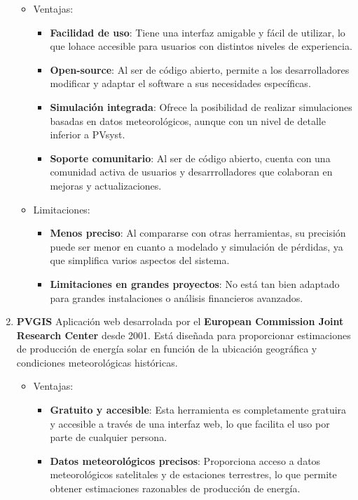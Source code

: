 \begin{enumerate}
\begin{itemize}
\item Ventajas:
\begin{itemize}
\item \textbf{Facilidad de uso}: Tiene una interfaz amigable y fácil de utilizar, lo que lohace accesible para usuarios con distintos niveles de experiencia.
\item \textbf{Open-source}: Al ser de código abierto, permite a los desarrolladores modificar y adaptar el software a sus necesidades específicas.
\item \textbf{Simulación integrada}: Ofrece la posibilidad de realizar simulaciones basadas en datos meteorológicos, aunque con un nivel de detalle inferior a PVsyst.
\item \textbf{Soporte comunitario}: Al ser de código abierto, cuenta con una comunidad activa de usuarios y desarrrolladores que colaboran en mejoras y actualizaciones.
\end{itemize}
\item Limitaciones:
\begin{itemize}
\item \textbf{Menos preciso}: Al compararse con otras herramientas, su precisión puede ser menor en cuanto a modelado y simulación de pérdidas, ya que simplifica varios aspectos del sistema.
\item \textbf{Limitaciones en grandes proyectos}: No está tan bien adaptado para grandes instalaciones o análisis financieros avanzados.
\end{itemize}
\end{itemize}
\item \textbf{PVGIS} \cite{pvgis}
Aplicación web desarrolada por el \textbf{European Commission Joint Research Center} desde 2001. Está diseñada para proporcionar estimaciones de producción de energía solar en función de la ubicación geográfica y condiciones meteorológicas históricas.
\begin{itemize}
\item Ventajas:
\begin{itemize}
\item \textbf{Gratuito y accesible}: Esta herramienta es completamente gratuira y accesible a través de una interfaz web, lo que facilita el uso por parte de cualquier persona.
\item \textbf{Datos meteorológicos precisos}: Proporciona acceso a datos meteorológicos satelitales y de estaciones terrestres, lo que permite obtener estimaciones razonables de producción de energía.

\end{itemize}
\end{itemize}
\end{enumerate}
